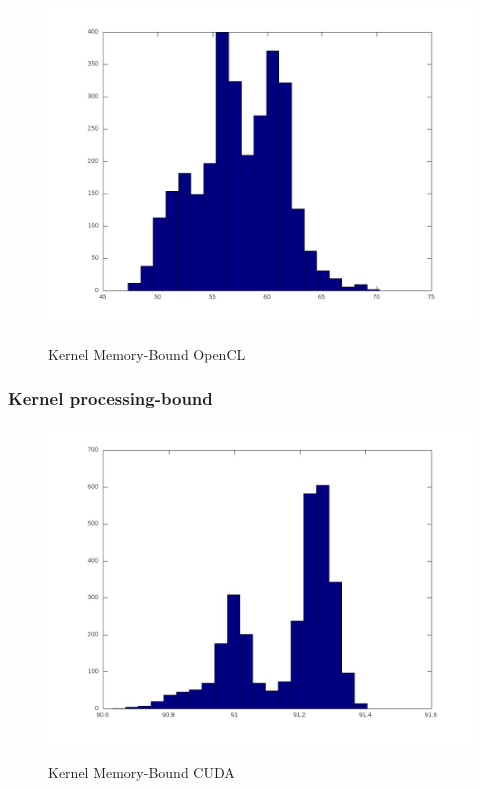 \begin{figure}[H]
  \begin{center}
    \includegraphics[scale=0.3]{resultados_opencl_memory_histo.jpg}
    \label{fig:Kernel Memory-Bound OpenCL}
    \caption{Kernel Memory-Bound OpenCL}
  \end{center}
\end{figure}

\subsubsection{Kernel processing-bound}

\begin{figure}[H]
  \begin{center}
    \includegraphics[scale=0.3]{resultados_cuda_process_histo.jpg}
    \label{fig:Kernel Memory-Bound CUDA}
    \caption{Kernel Memory-Bound CUDA}
  \end{center}
\end{figure}

